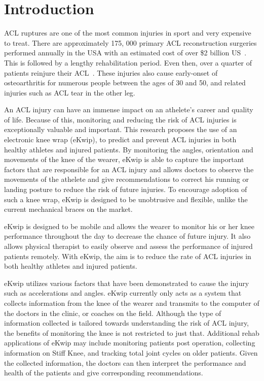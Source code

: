 \documentclass{sig-alternate}
\begin{document}
\section{Introduction}
\label{sec:intro}
ACL ruptures are one of the most common injuries in sport and very expensive to treat. There are approximately 175, 000 primary ACL reconstruction surgeries performed annually in the USA with an estimated cost of over \$2 billion US~\cite{yu2007mechanisms}. This is followed by a lengthy rehabilitation period. Even then, over a quarter of patients reinjure their ACL~\cite{stevenson1998gender}. These injuries also cause early-onset of osteoarthritis for numerous people between the ages of 30 and 50, and related injuries such as ACL tear in the other leg.~\cite{2d7e8810e30d11dd990c000ea68e967b}

An ACL injury can have an immense impact on an athelete's career and quality of life. Because of this, monitoring and reducing the risk of ACL injuries is exceptionally valuable and important. This research proposes the use of an electronic knee wrap (eKwip), to predict and prevent ACL injuries in both healthy athletes and injured patients. By monitoring the angles, orientation and movements of the knee of the wearer, eKwip is able to capture the important factors that are responsible for an ACL injury and allows doctors to observe the movements of the athelete and give recommendations to correct his running or landing posture to reduce the risk of future injuries.  To encourage adoption of such a knee wrap, eKwip is designed to be unobtrusive and flexible, unlike the current mechanical braces on the market.

eKwip is designed to be mobile and allows the wearer to monitor his or her knee performance throughout the day to decrease the chance of future injury. It also allows physical therapist to easily observe and assess the performance of injured patients remotely. With eKwip, the aim is to reduce the rate of ACL injuries in both healthy athletes and injured patients.

eKwip utilizes various factors that have been demonstrated to cause the injury such as accelerations and angles. eKwip currently only acts as a system that collects information from the knee of the wearer and transmits to the computer of the doctors in the clinic, or coaches on the field. Although the type of information collected is tailored towards understanding the risk of ACL injury, the benefits of monitoring the knee is not restricted to just that. Additional rehab applications of eKwip may include monitoring patients post operation, collecting information on Stiff Knee, and tracking total joint cycles on older patients. Given the collected information, the doctors can then interpret the performance and health of the patients and give corresponding recommendations.
\end{document}
